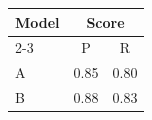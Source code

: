\begin{table}[htbp]
\centering
\begin{tabular}{lcc}
\toprule
\multirow{2}{*}{Model} & \multicolumn{2}{c}{Score} \\
\cmidrule(lr){2-3}
 & P & R \\
\midrule
A & 0.85 & 0.80 \\
B & 0.88 & 0.83 \\
\bottomrule
\end{tabular}
\end{table}
